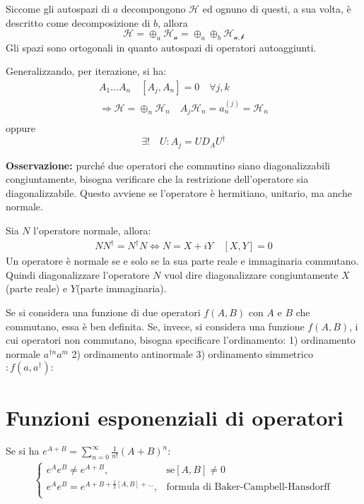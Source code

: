 Siccome gli autospazi di $a$ decompongono $\mathcal{H}$ ed ognuno di questi, a sua volta, è descritto come decomposizione di $b$, allora
$$
\mathcal{H}=\oplus_{a}\mathcal{H_{a}}=\oplus_{a}\oplus_{b}\mathcal{H_{a,b}}
$$
Gli spazi sono ortogonali in quanto autospazi di operatori autoaggiunti.

Generalizzando, per iterazione, si ha:
\begin{equation*}\begin{split}
A_1\dots A_n \quad \left[A_j,A_n\right]=0 \quad \forall j,k\\
\Longrightarrow \mathcal{H}=\oplus_{n}\mathcal{H}_n \quad A_j\mathcal{H}_n=a_n^{\left(j\right)}=\mathcal{H}_n \\
\end{split}\end{equation*}
oppure
$$
\exists!\quad U:A_j=UD_AU^{\dagger}
$$

\textbf{Osservazione:} purché due operatori che commutino siano diagonalizzabili congiuntamente, bisogna verificare che la restrizione dell'operatore sia diagonalizzabile. Questo avviene se l'operatore è hermitiano, unitario, ma anche normale.

Sia $N$ l'operatore normale, allora:
\begin{equation*}\begin{split}
NN^{\dagger}=N^{\dagger}N\Longleftrightarrow
N=X+iY \quad \left[X,Y\right]=0
\end{split}\end{equation*}
Un operatore è normale se e solo se la sua parte reale e immaginaria commutano.
Quindi diagonalizzare l'operatore $N$ vuol dire diagonalizzare congiuntamente $X$(parte reale) e $Y$(parte immaginaria).

Se si considera una funzione di due operatori $f\left(A,B\right)$ con $A$ e $B$ che commutano, essa è ben definita.
Se, invece, si considera una funzione  $f\left(A,B\right)$, i cui operatori non commutano, bisogna specificare l'ordinamento:
1) ordinamento normale $a^{\dagger n}a^{m}$
2) ordinamento antinormale
3) ordinamento simmetrico $:f(a,a^{\dagger}):$

\section{Funzioni esponenziali di operatori}
Se si ha $e^{A+B}=\sum_{n=0}^{\infty }{\frac{1}{n!}\left(A+B\right)^n}$:
\begin{equation*}\begin{split}
\begin{cases}
e^Ae^B\neq e^{A+B}, & \textrm{se} \left[A,B\right]\neq 0\\
e^{A}e^B=e^{A+B+\frac{1}{2}\left[A,B\right]+\dots}, & \textrm{formula di Baker-Campbell-Hansdorff} \\
\end{cases}
\end{split}\end{equation*}

